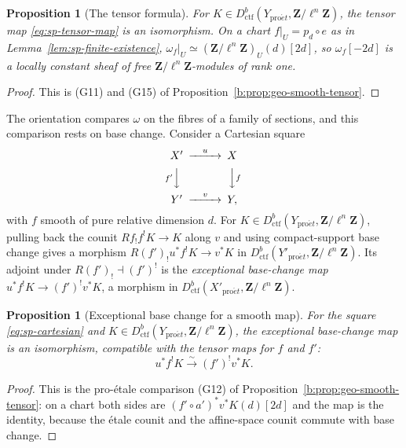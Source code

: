 \documentclass[11pt,a4paper]{article}
\numberwithin{equation}{section}
\newtheorem{proposition}[theorem]{Proposition}
\theoremstyle{definition}
\theoremstyle{remark}
\newcommand{\proet}{\mathrm{pro}\acute{e}t}
\newcommand{\Dctf}{D^b_{\mathrm{ctf}}}
\begin{document}
\begin{proposition}[The tensor formula]\label{prop:sp-tensor}
For $K\in\Dctf(Y_{\proet},\mathbf Z/\ell^n\mathbf Z)$, the tensor map
\eqref{eq:sp-tensor-map} is an isomorphism. On a chart $f|_U=p_d\circ e$
as in Lemma~\ref{lem:sp-finite-existence},
$\omega_f|_U\simeq(\mathbf Z/\ell^n\mathbf Z)_U(d)[2d]$, so
$\omega_f[-2d]$ is a locally constant sheaf of free
$\mathbf Z/\ell^n\mathbf Z$-modules of rank one.
\end{proposition}
\begin{proof}
This is (G11) and (G15) of
Proposition~\ref{b:prop:geo-smooth-tensor}.
\end{proof}

The orientation compares $\omega$ on the fibres of a family of
sections, and this comparison rests on base change. Consider a Cartesian square
\begin{equation}\label{eq:sp-cartesian}
\begin{CD}
 X' @>{u}>> X\\
 @V{f'}VV @VV{f}V\\
 Y' @>{v}>> Y,
\end{CD}
\end{equation}
with $f$ smooth of pure relative dimension $d$. For
$K\in\Dctf(Y_{\proet},\mathbf Z/\ell^n\mathbf Z)$, pulling back the
counit $Rf_!f^{!}K\to K$ along $v$ and using compact-support base change
gives a morphism $R(f')_!u^{*}f^{!}K\to v^{*}K$ in
$\Dctf(Y'_{\proet},\mathbf Z/\ell^n\mathbf Z)$. Its adjoint under
$R(f')_!\dashv(f')^!$ is the \emph{exceptional base-change map}
$u^*f^!K\to(f')^!v^*K$, a morphism in
$\Dctf(X'_{\proet},\mathbf Z/\ell^n\mathbf Z)$.

\begin{proposition}[Exceptional base change for a smooth map]
\label{prop:sp-exceptional-bc}
For the square \eqref{eq:sp-cartesian} and
$K\in\Dctf(Y_{\proet},\mathbf Z/\ell^n\mathbf Z)$, the exceptional
base-change map is an isomorphism, compatible with the tensor maps for
$f$ and $f'$:
\begin{equation}\label{eq:sp-exceptional-bc}
 u^{*}f^{!}K
       \xrightarrow{\sim}(f')^{!}v^{*}K.
\end{equation}
\end{proposition}
\begin{proof}
This is the pro-\'etale comparison (G12) of
Proposition~\ref{b:prop:geo-smooth-tensor}: on a chart both sides are
$(f'\circ a')^*v^*K(d)[2d]$ and the map is the identity, because the
\'etale counit and the affine-space counit commute with base change.
\end{proof}
\end{document}
